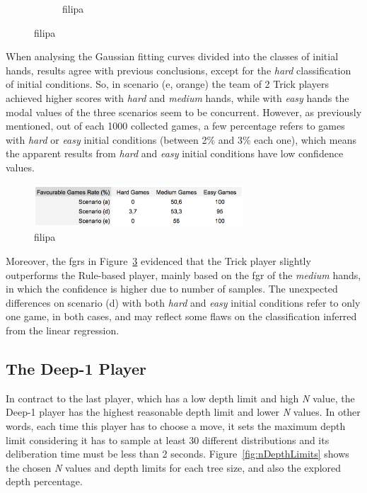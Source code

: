 \begin{figure}[h]
\begin{subfigure}[h]{0.32\textwidth}
                \caption{filipa}
                \label{fig:ADEeasy}
        \end{subfigure}
        \caption{filipa}
        \label{fig:ADE-CH}
\end{figure}

When analysing the Gaussian fitting curves divided into the classes of initial hands, results agree with previous conclusions, except for the \emph{hard} classification of initial conditions.
So, in scenario (e, orange) the team of 2 Trick players achieved higher scores with \emph{hard} and \emph{medium} hands, while with \emph{easy} hands the modal values of the three scenarios seem to be concurrent.
However, as previously mentioned, out of each 1000 collected games, a few percentage refers to games with \emph{hard} or \emph{easy} initial conditions (between 2\% and 3\% each one), which means the apparent results from \emph{hard} and \emph{easy} initial conditions have low confidence values.

\begin{figure}[h!]
  \centering
    \includegraphics[width=0.7\textwidth]{./img/4/ADE-fgr}
  \caption{filipa}
\label{fig:ADE-fgr}
\end{figure}

Moreover, the \acp{fgr} in Figure~\ref{fig:ADE-fgr} evidenced that the Trick player slightly outperforms the Rule-based player, mainly based on the \ac{fgr} of the \emph{medium} hands, in which the confidence is higher due to number of samples.
The unexpected differences on scenario (d) with both \emph{hard} and \emph{easy} initial conditions refer to only one game, in both cases, and may reflect some flaws on the classification inferred from the linear regression.



\subsection{The Deep-1 Player}

In contract to the last player, which has a low depth limit and high \emph{N} value, the Deep-1 player has the highest reasonable depth limit and lower \emph{N} values.
In other words, each time this player has to choose a move, it sets the maximum depth limit considering it has to sample at least 30 different distributions and its deliberation time must be less than 2 seconds.
Figure~\ref{fig:nDepthLimits} shows the chosen \emph{N} values and depth limits for each tree size, and also the explored depth percentage.

